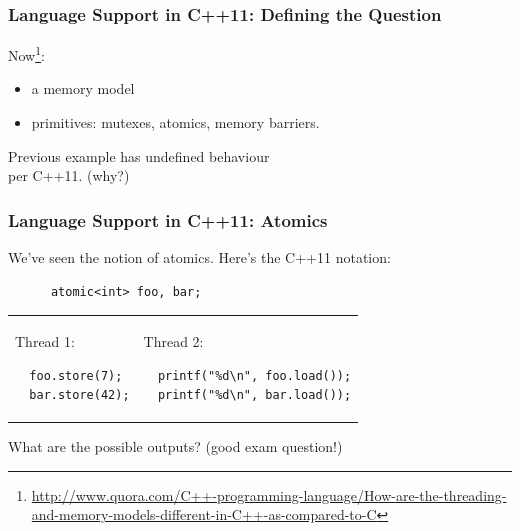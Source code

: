\begin{frame}
  \frametitle{Language Support in C++11: Defining the Question}

  

    Now\footnote{\url{http://www.quora.com/C++-programming-language/How-are-the-threading-and-memory-models-different-in-C++-as-compared-to-C}}:
    \begin{itemize}
    \item a memory model
    \item primitives: mutexes, atomics, memory barriers.
    \end{itemize}

    Previous example has undefined behaviour \\ \qquad per C++11. (why?)
  
\end{frame}

\begin{frame}[fragile]
  \frametitle{Language Support in C++11: Atomics}

  
    We've seen the notion of atomics. Here's the C++11 notation:

    \begin{lstlisting}
      atomic<int> foo, bar;      
    \end{lstlisting}
    
    \begin{tabular}{ll}
      \begin{minipage}{.25\textwidth}
        Thread 1:
        \begin{lstlisting}
  foo.store(7);
  bar.store(42);
        \end{lstlisting}
      \end{minipage} &
      \begin{minipage}{.45\textwidth}
        Thread 2:
        \begin{lstlisting}
  printf("%d\n", foo.load());
  printf("%d\n", bar.load());
        \end{lstlisting}
      \end{minipage}
    \end{tabular}

    What are the possible outputs? (good exam question!)
  
\end{frame}


